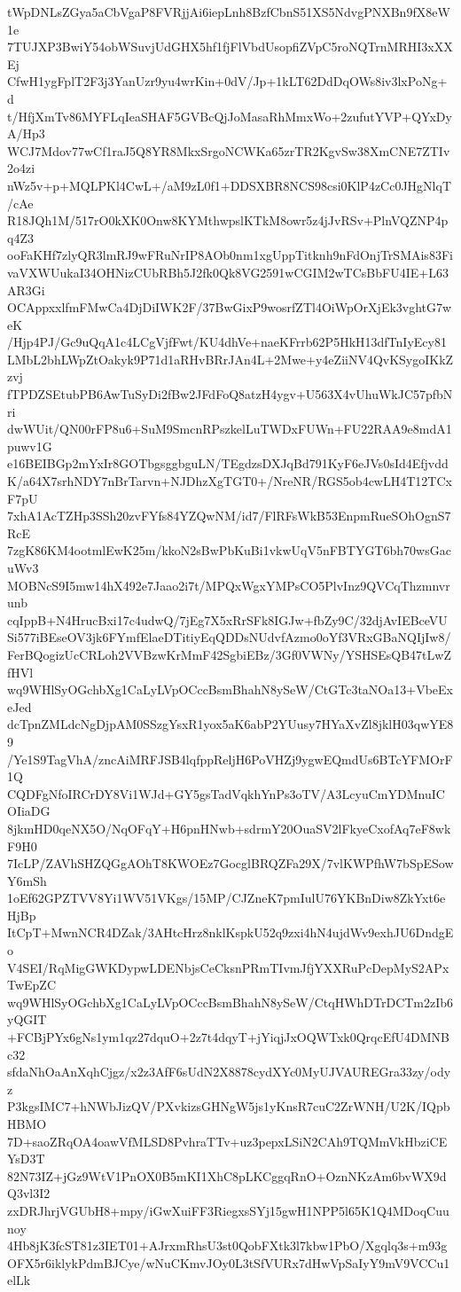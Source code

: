 tWpDNLsZGya5aCbVgaP8FVRjjAi6iepLnh8BzfCbnS51XS5NdvgPNXBn9fX8eW1e
7TUJXP3BwiY54obWSuvjUdGHX5hf1fjFlVbdUsopfiZVpC5roNQTrnMRHI3xXXEj
CfwH1ygFplT2F3j3YanUzr9yu4wrKin+0dV/Jp+1kLT62DdDqOWs8iv3lxPoNg+d
t/HfjXmTv86MYFLqIeaSHAF5GVBcQjJoMasaRhMmxWo+2zufutYVP+QYxDyA/Hp3
WCJ7Mdov77wCf1raJ5Q8YR8MkxSrgoNCWKa65zrTR2KgvSw38XmCNE7ZTIv2o4zi
nWz5v+p+MQLPKl4CwL+/aM9zL0f1+DDSXBR8NCS98csi0KlP4zCc0JHgNlqT/cAe
R18JQh1M/517rO0kXK0Onw8KYMthwpslKTkM8owr5z4jJvRSv+PlnVQZNP4pq4Z3
ooFaKHf7zlyQR3lmRJ9wFRuNrIP8AOb0nm1xgUppTitknh9nFdOnjTrSMAis83Fi
vaVXWUukaI34OHNizCUbRBh5J2fk0Qk8VG2591wCGIM2wTCsBbFU4IE+L63AR3Gi
OCAppxxlfmFMwCa4DjDiIWK2F/37BwGixP9wosrfZTl4OiWpOrXjEk3vghtG7weK
/Hjp4PJ/Gc9uQqA1c4LCgVjfFwt/KU4dhVe+naeKFrrb62P5HkH13dfTnIyEcy81
LMbL2bhLWpZtOakyk9P71d1aRHvBRrJAn4L+2Mwe+y4eZiiNV4QvKSygoIKkZzvj
fTPDZSEtubPB6AwTuSyDi2fBw2JFdFoQ8atzH4ygv+U563X4vUhuWkJC57pfbNri
dwWUit/QN00rFP8u6+SuM9SmcnRPszkelLuTWDxFUWn+FU22RAA9e8mdA1puwv1G
e16BEIBGp2mYxIr8GOTbgsggbguLN/TEgdzsDXJqBd791KyF6eJVs0sId4Efjvdd
K/a64X7srhNDY7nBrTarvn+NJDhzXgTGT0+/NreNR/RGS5ob4cwLH4T12TCxF7pU
7xhA1AcTZHp3SSh20zvFYfs84YZQwNM/id7/FlRFsWkB53EnpmRueSOhOgnS7RcE
7zgK86KM4ootmlEwK25m/kkoN2sBwPbKuBi1vkwUqV5nFBTYGT6bh70wsGacuWv3
MOBNcS9I5mw14hX492e7Jaao2i7t/MPQxWgxYMPsCO5PlvInz9QVCqThzmnvrunb
cqIppB+N4HrucBxi17c4udwQ/7jEg7X5xRrSFk8IGJw+fbZy9C/32djAvIEBceVU
Si577iBEseOV3jk6FYmfElaeDTitiyEqQDDsNUdvfAzmo0oYf3VRxGBaNQIjIw8/
FerBQogizUcCRLoh2VVBzwKrMmF42SgbiEBz/3Gf0VWNy/YSHSEsQB47tLwZfHVl
wq9WHlSyOGchbXg1CaLyLVpOCccBsmBhahN8ySeW/CtGTc3taNOa13+VbeExeJed
dcTpnZMLdcNgDjpAM0SSzgYsxR1yox5aK6abP2YUusy7HYaXvZl8jklH03qwYE89
/Ye1S9TagVhA/zncAiMRFJSB4lqfppReljH6PoVHZj9ygwEQmdUs6BTcYFMOrF1Q
CQDFgNfoIRCrDY8Vi1WJd+GY5gsTadVqkhYnPs3oTV/A3LcyuCmYDMnuICOIiaDG
8jkmHD0qeNX5O/NqOFqY+H6pnHNwb+sdrmY20OuaSV2lFkyeCxofAq7eF8wkF9H0
7IcLP/ZAVhSHZQGgAOhT8KWOEz7GocglBRQZFa29X/7vlKWPfhW7bSpESowY6mSh
1oEf62GPZTVV8Yi1WV51VKgs/15MP/CJZneK7pmIulU76YKBnDiw8ZkYxt6eHjBp
ItCpT+MwnNCR4DZak/3AHtcHrz8nklKspkU52q9zxi4hN4ujdWv9exhJU6DndgEo
V4SEI/RqMigGWKDypwLDENbjsCeCksnPRmTIvmJfjYXXRuPcDepMyS2APxTwEpZC
wq9WHlSyOGchbXg1CaLyLVpOCccBsmBhahN8ySeW/CtqHWhDTrDCTm2zIb6yQGIT
+FCBjPYx6gNs1ym1qz27dquO+2z7t4dqyT+jYiqjJxOQWTxk0QrqcEfU4DMNBc32
sfdaNhOaAnXqhCjgz/x2z3AfF6sUdN2X8878cydXYc0MyUJVAUREGra33zy/odyz
P3kgsIMC7+hNWbJizQV/PXvkizsGHNgW5js1yKnsR7cuC2ZrWNH/U2K/IQpbHBMO
7D+saoZRqOA4oawVfMLSD8PvhraTTv+uz3pepxLSiN2CAh9TQMmVkHbziCEYsD3T
82N73IZ+jGz9WtV1PnOX0B5mKI1XhC8pLKCggqRnO+OznNKzAm6bvWX9dQ3vl3I2
zxDRJhrjVGUbH8+mpy/iGwXuiFF3RiegxsSYj15gwH1NPP5l65K1Q4MDoqCuunoy
4Hb8jK3fcST81z3IET01+AJrxmRhsU3st0QobFXtk3l7kbw1PbO/Xgqlq3s+m93g
OFX5r6iklykPdmBJCye/wNuCKmvJOy0L3tSfVURx7dHwVpSaIyY9mV9VCCu1elLk
